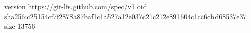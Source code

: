 version https://git-lfs.github.com/spec/v1
oid sha256:c25154cf7f2878a87baf1c1a527a12e037c21c212e891604c1cc6cbd68537e37
size 13756
